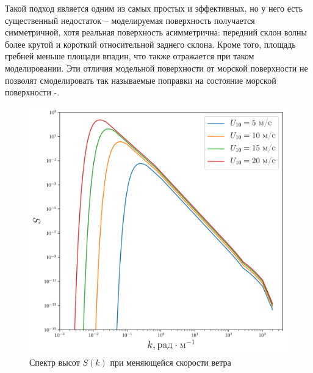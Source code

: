 Такой подход является одним из самых простых и эффективных, но у
него есть существенный недостаток – моделируемая поверхность получается симметричной, хотя реальная поверхность асимметрична: передний склон
волны более крутой и короткий относительной заднего склона.
Кроме того, площадь гребней меньше площади впадин, что также отражается при
таком моделировании. Эти отличия модельной поверхности от морской поверхности
не позволят смоделировать так называемые поправки на состояние морской
поверхности \cite{cite:12}-\cite{cite:13}. 
\begin{figure}[ht]
        \centering
        \includegraphics[width=0.6\linewidth]{fig/full_spectrum1.png}
        \caption{Спектр высот $S(k)$ при меняющейся скорости ветра}
        \label{fig:spectrum_heights}
\end{figure}
